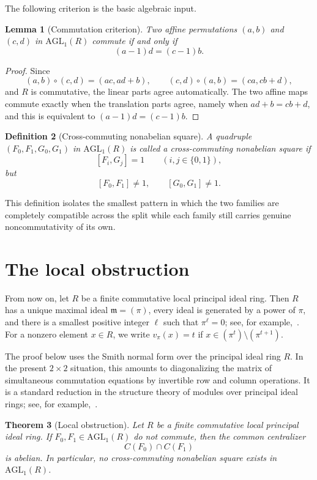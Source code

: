\documentclass[11pt]{article}
\newcommand{\AGL}{\mathrm{AGL}_1}
\newcommand{\comm}[2]{[#1,#2]}
\theoremstyle{uprightthm}
\newtheorem{theorem}{Theorem}[section]
\newtheorem{lemma}[theorem]{Lemma}
\newtheorem{definition}[theorem]{Definition}
\begin{document}
The following criterion is the basic algebraic input.

\begin{lemma}[Commutation criterion]
\label{lem:comm-criterion-en}
Two affine permutations $(a,b)$ and $(c,d)$ in $\AGL(R)$ commute if and only if
\[
(a-1)d=(c-1)b.
\]
\end{lemma}

\begin{proof}
Since
\[
(a,b)\circ(c,d)=(ac,ad+b),\qquad
(c,d)\circ(a,b)=(ca,cb+d),
\]
and $R$ is commutative, the linear parts agree automatically. The two affine
maps commute exactly when the translation parts agree, namely when
$ad+b=cb+d$, and this is equivalent to $(a-1)d=(c-1)b$.
\end{proof}

\begin{definition}[Cross-commuting nonabelian square]
\label{def:square-en}
A quadruple $(F_0,F_1,G_0,G_1)$ in $\AGL(R)$ is called a
\emph{cross-commuting nonabelian square} if
\[
\comm{F_i}{G_j}=1\qquad (i,j\in\{0,1\}),
\]
but
\[
\comm{F_0}{F_1}\ne 1,\qquad \comm{G_0}{G_1}\ne 1.
\]
\end{definition}

This definition isolates the smallest pattern in which the two families are
completely compatible across the split while each family still carries genuine
noncommutativity of its own.

\section{The local obstruction}
From now on, let $R$ be a finite commutative local principal ideal ring. Then
$R$ has a unique maximal ideal $\mathfrak m=(\pi)$, every ideal is generated by
a power of $\pi$, and there is a smallest positive integer $\ell$ such that
$\pi^\ell=0$; see, for example,~\cite{McDonald1974}. For a nonzero element
$x\in R$, we write $v_\pi(x)=t$ if $x\in (\pi^t)\setminus (\pi^{t+1})$.

The proof below uses the Smith normal form over the principal ideal ring $R$.
In the present $2\times 2$ situation, this amounts to diagonalizing the matrix
of simultaneous commutation equations by invertible row and column operations.
It is a standard reduction in the structure theory of modules over principal
ideal rings; see, for example,~\cite{McDonald1974}.

\begin{theorem}[Local obstruction]
\label{thm:local-obstruction-en}
Let $R$ be a finite commutative local principal ideal ring. If
$F_0,F_1\in\AGL(R)$ do not commute, then the common centralizer
\[
C(F_0)\cap C(F_1)
\]
is abelian. In particular, no cross-commuting nonabelian square exists in
$\AGL(R)$.
\end{theorem}
\end{document}
